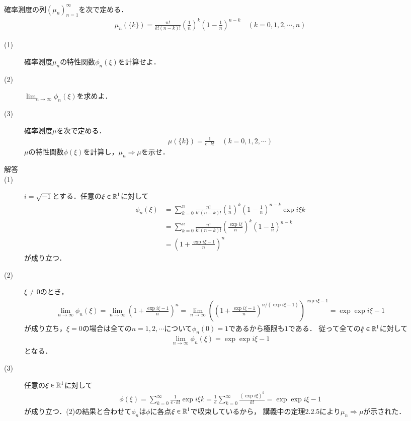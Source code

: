 \newpage
\begin{description}
	\item[] 確率測度の列$(\mu_n)_{n=1}^{\infty}$を次で定める．
		\begin{align}
			\mu_n(\{k\}) = \frac{n!}{k!(n-k)!} \left( \frac{1}{n} \right)^k \left( 1 - \frac{1}{n} \right)^{n-k} \quad (k=0,1,2,\cdots,n)
		\end{align}
		\begin{description}
			\item[(1)] 確率測度$\mu_n$の特性関数$\phi_n(\xi)$を計算せよ．
			\item[(2)] $\lim_{n \to \infty} \phi_n(\xi)$を求めよ．
			\item[(3)] 確率測度$\mu$を次で定める．
				\begin{align}
					\mu(\{k\}) = \frac{1}{e \cdot k!} \quad (k=0,1,2,\cdots)
				\end{align}
				$\mu$の特性関数$\phi(\xi)$を計算し，$\mu_n \Rightarrow \mu$を示せ．
		\end{description}
		\begin{description}
			\item[解答]
			\item[(1)] $i=\sqrt{-1}$とする．任意の$\xi \in \mathbb{R}^1$に対して
				\begin{align}
					\phi_n(\xi) &= \sum_{k=0}^{n} \frac{n!}{k!(n-k)!} \left( \frac{1}{n} \right)^k \left( 1 - \frac{1}{n}\right)^{n-k} \exp{i \xi k}  \\
					&= \sum_{k=0}^{n} \frac{n!}{k!(n-k)!} \left( \frac{\exp{i \xi}}{n} \right)^k \left( 1 - \frac{1}{n} \right)^{n-k} \\
					&= \left( 1 + \frac{\exp{i \xi} - 1}{n} \right)^n
				\end{align}
				が成り立つ．
			\item[(2)] $\xi \neq 0$のとき，
				\begin{align}
					\lim_{n \to \infty} \phi_n(\xi) = \lim_{n \to \infty} \left( 1 + \frac{\exp{i \xi} - 1}{n} \right)^n = \lim_{n \to \infty} \left( \left( 1 + \frac{\exp{i \xi} - 1}{n} \right)^{n/(\exp{i \xi} - 1)} \right)^{\exp{i \xi} - 1} = \exp{\exp{i \xi} - 1}
				\end{align}
				が成り立ち，$\xi = 0$の場合は全ての$n = 1,2,\cdots$について$\phi_n(0) = 1$であるから極限も$1$である．
				従って全ての$\xi \in \mathbb{R}^1$に対して
				\begin{align}
					\lim_{n \to \infty} \phi_n(\xi) = \exp{\exp{i \xi} - 1}
				\end{align}
				となる．
			\item[(3)] 任意の$\xi \in \mathbb{R}^1$に対して
				\begin{align}
					\phi(\xi) = \sum_{k=0}^{\infty} \frac{1}{e \cdot k!} \exp{i \xi k} = \frac{1}{e} \sum_{k=0}^{\infty} \frac{(\exp{i \xi})^k}{k!} = \exp{\exp{i \xi} - 1}
				\end{align}
				が成り立つ．(2)の結果と合わせて$\phi_n$は$\phi$に各点$\xi \in \mathbb{R}^1$で収束しているから，
				講義中の定理2.2.5により$\mu_n \Rightarrow \mu$が示された．
				\QED
		\end{description}
\end{description}